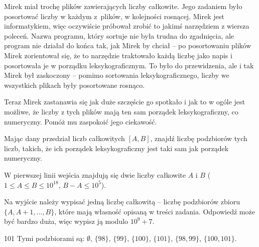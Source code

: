 

\usepackage[utf8]{inputenc}
\usepackage[T1]{fontenc}
\usepackage[polish]{babel}
\usepackage{polski}





Mirek miał trochę plików zawierających liczby całkowite.
Jego zadaniem było posortować liczby w każdym z~plików, w kolejności rosnącej.
Mirek jest informatykiem, więc oczywiście próbował zrobić to jakimś narzędziem z wiersza poleceń.
Nazwa programu, który sortuje nie była trudna do zgadnięcia, ale program nie działał do końca tak, jak Mirek by chciał
	-- po posortowaniu plików Mirek zorientował się, że to narzędzie traktowało każdą liczbę jako napis
	i posortowała je w porządku leksykograficznym.
To było do przewidzenia, ale i tak Mirek był zaskoczony -- pomimo sortowania leksykograficznego,
	liczby we wszystkich plikach były posortowane rosnąco.

Teraz Mirek zastanawia się jak duże szczęście go spotkało i jak to w ogóle jest możliwe,
	że liczby z tych plików mają ten sam porządek leksykograficzny, co numeryczny.
Pomóż mu zaspokoić jego ciekawość.


Mając dany przedział liczb całkowitych $[A, B]$, znajdź liczbę podzbiorów tych liczb,
	takich, że ich porządek leksykograficzny jest taki sam jak porządek numeryczny.


W pierwszej linii wejścia znajdują się dwie liczby całkowite $A$ i $B$
	($1 \le A \le B \le 10^{18}$, $B - A \le 10^5$).


Na wyjście należy wypisać jedną liczbę całkowitą -- liczbę podzbiorów zbioru $\{A, A+1, \ldots, B\}$,
	które mają własność opisaną w treści zadania.
Odpowiedź może być bardzo duża, więc wypisz ją modulo $10^9+7$.


 101
\sampleCOMMENT
Tymi podzbiorami są: $\emptyset$, $\{98\}$, $\{99\}$, $\{100\}$, $\{101\}$,	$\{98, 99\}$, $\{100, 101\}$.
\sampleEND


